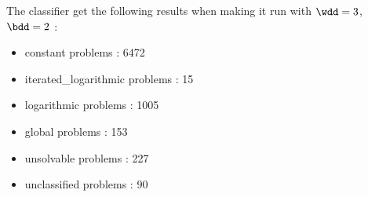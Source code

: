 The classifier get the following results when making it run with $\wdd = 3$, $\bdd = 2$ :
\begin{itemize}
    \item constant problems : 6472
    \item iterated_logarithmic problems : 15
    \item logarithmic problems : 1005
    \item global problems : 153
    \item unsolvable problems : 227
    \item unclassified problems : 90
\end{itemize}
